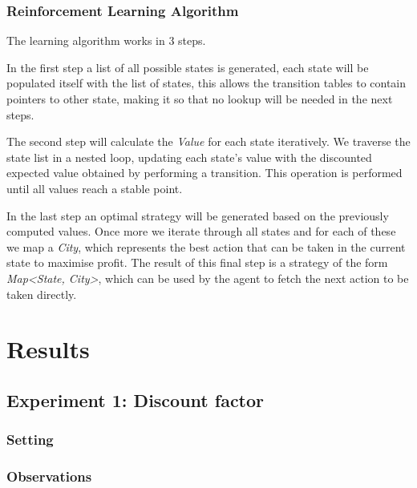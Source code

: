 \documentclass[11pt]{article}
\begin{document}
\subsubsection{Reinforcement Learning Algorithm}

The learning algorithm works in 3 steps.

In the first step a list of all possible states is generated, each state will be populated itself with the list of states, this allows the transition tables to contain pointers to other state, making it so that no lookup will be needed in the next steps.

The second step will calculate the \textit{Value} for each state iteratively. We traverse the state list in a nested loop, updating each state's value with the discounted expected value obtained by performing a transition. This operation is performed until all values reach a stable point.

In the last step an optimal strategy will be generated based on the previously computed values. Once more we iterate through all states and for each of these we map a \textit{City}, which represents the best action that can be taken in the current state to maximise profit.
The result of this final step is a strategy of the form \textit{Map<State, City>}, which can be used by the agent to fetch the next action to be taken directly.


\section{Results}

\subsection{Experiment 1: Discount factor}

\subsubsection{Setting}

\subsubsection{Observations}
\end{document}
